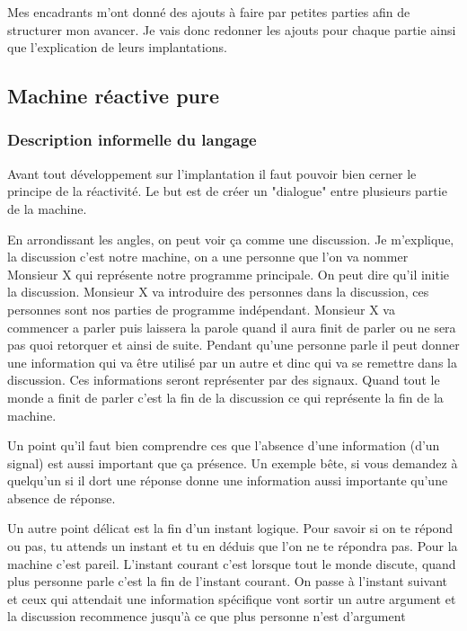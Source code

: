 \documentclass[10pt,a4paper]{article}
\begin{document}
		Mes encadrants m'ont donné des ajouts à faire par petites parties afin de structurer mon avancer. Je vais donc redonner les ajouts pour chaque partie ainsi que l'explication de leurs implantations.
		\bigbreak
			
			
		\subsection{Machine réactive pure}
		
			\subsubsection{Description informelle du langage}
				
				Avant tout développement sur l'implantation il faut pouvoir bien cerner le principe de la réactivité. Le but est de créer un "dialogue" entre plusieurs partie de la machine. 
				\medbreak
					
				En arrondissant les angles, on peut voir ça comme une discussion. Je m'explique, la discussion c'est notre machine, on a une personne que l'on va nommer Monsieur X qui représente notre programme principale. On peut dire qu'il initie la discussion. Monsieur X va introduire des personnes dans la discussion, ces personnes sont nos parties de programme indépendant. Monsieur X va commencer a parler puis laissera la parole quand il aura finit de parler ou ne sera pas quoi retorquer et ainsi de suite. Pendant qu'une personne parle il peut donner une information qui va être utilisé par un autre et dinc qui va se remettre dans la discussion. Ces informations seront représenter par des signaux. Quand tout le monde a finit de parler c'est la fin de la discussion ce qui représente la fin de la machine.
				\medbreak
					
				Un point qu'il faut bien comprendre ces que l'absence d'une information (d'un signal) est aussi important que ça présence. Un exemple bête, si vous demandez à quelqu'un si il dort une réponse donne une information aussi importante qu'une absence de réponse.
				\medbreak
					
				Un autre point délicat est la fin d'un instant logique. Pour savoir si on te répond ou pas, tu attends un instant et tu en déduis que l'on ne te répondra pas. Pour la machine c'est pareil. L'instant courant c'est lorsque tout le monde discute, quand plus personne parle c'est la fin de l'instant courant. On passe à l'instant suivant et ceux qui attendait une information spécifique vont sortir un autre argument et la discussion recommence jusqu'à ce que plus personne n'est d'argument
				\medbreak
					
\end{document}
